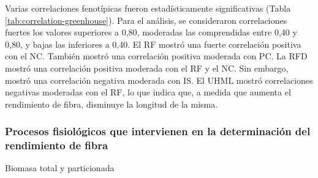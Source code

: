 \documentclass[12pt,oneside]{reedthesis}
\begin{document}
Varias correlaciones fenotípicas fueron estadísticamente significativas (Tabla \ref{tab:correlation-greenhouse}). Para el análisis, se consideraron correlaciones fuertes los valores superiores a 0,80, moderadas las comprendidas entre 0,40 y 0,80, y bajas las inferiores a 0,40. El RF mostró una fuerte correlación positiva con el NC. También mostró una correlación positiva moderada con PC. La RFD mostró una correlación positiva moderada con el RF y el NC. Sin embargo, mostró una correlación negativa moderada con IS. El UHML mostró correlaciones negativas moderadas con el RF, lo que indica que, a medida que aumenta el rendimiento de fibra, disminuye la longitud de la misma.

\subsubsection{Procesos fisiológicos que intervienen en la determinación del rendimiento de fibra}\label{procesos-fisioluxf3gicos-que-intervienen-en-la-determinaciuxf3n-del-rendimiento-de-fibra}

Biomasa total y particionada
\end{document}
